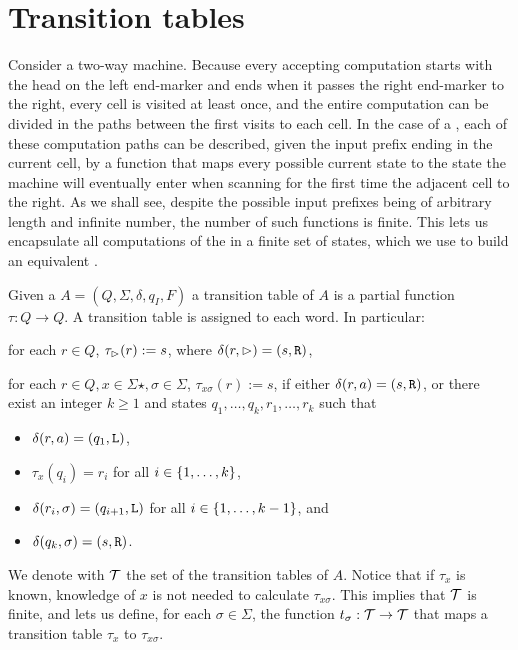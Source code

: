 \section{Transition tables}\label{sec:transtab2DFA}
Consider a two-way machine.
Because every accepting computation starts with the head on the left end-marker and ends when it passes the right end-marker to the right, every cell is visited at least once, and the entire computation can be divided in the paths between the first visits to each cell.
In the case of a \TDFA, each of these computation paths can be described, given the input prefix ending in the current cell, by a function that maps every possible current state to the state the machine will eventually enter when scanning for the first time the adjacent cell to the right.
As we shall see, despite the possible input prefixes being of arbitrary length and infinite number, the number of such functions is finite.
This lets us encapsulate all computations of the \TDFA in a finite set of states, which we use to build an equivalent \DFA.

\begin{defn}
	Given a \TDFA $A=(Q,\Sigma,\delta,q_I,F)$ a transition table of $A$ is a partial function $\tau:Q\to Q$.
	A transition table is assigned to each word. In particular:
	\begin{rules}
		\item for each $r\in Q$, $\tau_\rhd(r):=s$, where $\delta(r,\rhd)=(s,\mathtt R)$,
		\item for each $r\in Q,x\in\Sigma\star,\sigma\in\Sigma$, $\tau_{x\sigma}(r):=s$, if either $\delta(r,a)=(s,\mathtt R)$, or there exist an integer $k\ge1$ and states $q_1,\dots,q_k,r_1,\dots,r_k$ such that
		\begin{itemize}
			\item $\delta(r,a)=(q_1,\mathtt L)$,
			\item $\tau_x(q_i)=r_i$ for all $i\in\{1,\dots,k\}$,
			\item $\delta(r_i,\sigma)=(q_{i+1},\mathtt L)$ for all $i\in\{1,\dots,k-1\}$, and
			\item $\delta(q_k,\sigma)=(s,\mathtt R)$.
		\end{itemize}
	\end{rules}
	We denote with $\mathcal T$ the set of the transition tables of $A$.
	Notice that if $\tau_x$ is known, knowledge of $x$ is not needed to calculate $\tau_{x\sigma}$.
	This implies that $\mathcal T$ is finite, and lets us define, for each $\sigma\in\Sigma$, the function $t_\sigma:\mathcal T\to\mathcal T$ that maps a transition table $\tau_x$ to $\tau_{x\sigma}$.
\end{defn}

